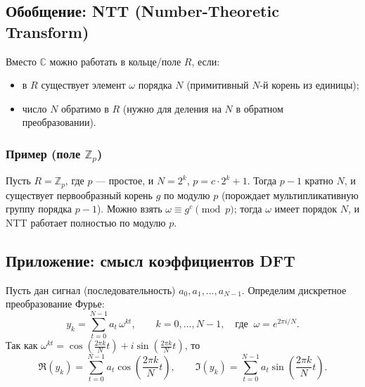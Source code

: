 \subsection*{Обобщение: NTT (Number-Theoretic Transform)}

Вместо $\mathbb{C}$ можно работать в кольце/поле $R$, если:
\begin{itemize}
	\item в $R$ существует элемент $\omega$ порядка $N$ (примитивный $N$-й корень из единицы);
	\item число $N$ обратимо в $R$ (нужно для деления на $N$ в обратном преобразовании).
\end{itemize}

\subsubsection*{Пример (поле $\mathbb{Z}_p$)}

Пусть $R=\mathbb{Z}_p$, где $p$ — простое, и $N=2^k$, $p=c\cdot 2^k+1$.
Тогда $p-1$ кратно $N$, и существует первообразный корень $g$ по модулю $p$
(порождает мультипликативную группу порядка $p-1$).
Можно взять $\omega \equiv g^c \pmod p$; тогда $\omega$ имеет порядок $N$, и NTT работает полностью по модулю $p$.

\subsection*{Приложение: смысл коэффициентов DFT}

Пусть дан сигнал (последовательность) $a_0,a_1,\dots,a_{N-1}$.
Определим дискретное преобразование Фурье:
\[
y_k=\sum_{t=0}^{N-1} a_t\,\omega^{kt},\qquad k=0,\dots,N-1,
\quad \text{где }\ \omega=e^{2\pi i/N}.
\]
Так как $\omega^{kt}=\cos\!\left(\frac{2\pi k}{N}t\right)+i\sin\!\left(\frac{2\pi k}{N}t\right)$, то
\[
\Re(y_k)=\sum_{t=0}^{N-1} a_t\cos\!\left(\frac{2\pi k}{N}t\right),
\qquad
\Im(y_k)=\sum_{t=0}^{N-1} a_t\sin\!\left(\frac{2\pi k}{N}t\right).
\]

